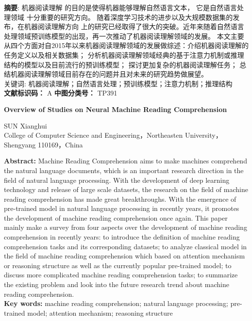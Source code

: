 \noindent \textbf{摘\quad 要}: 机器阅读理解
的目的是使得机器能够理解自然语言文本，
它是自然语言处理领域
十分重要的研究方向。
随着深度学习技术的进步以及大规模数据集的发布，在机器阅读理解方向
上的研究已经取得了很大的突破。近年来随着自然语言处理领域预训练模型的出现，再一次推动了机器阅读理解领域的发展。
本文主要从四个方面对自2015年以来机器阅读理解领域的发展做综述：介绍机器阅读理解的任务定义以及相关数据集；
分析机器阅读理解领域经典的基于注意力机制或推理结构的模型以及目前流行的预训练模型；
探讨更加复杂的机器阅读理解任务；
总结机器阅读理解领域目前存在的问题并且对未来的研究趋势做展望。\\
\heiti 关键词: \songti 机器阅读理解；自然语言处理；预训练模型；注意力机制；推理结构　\\
\textbf{文献标识码：} A  \qquad \textbf{中图分类号：} TP391
\begin{center}
    \textbf{ Overview of Studies on Neural Machine Reading Comprehension \\}

 SUN Xianghui \\
College of Computer Science and Engineering，Northeasten University，Shengyang 110169，China

\end{center}
\textbf{Abstract:} Machine Reading Comprehension aims to make machines comprehend the natural language documents, which 
is an important research direction
 in the field of natural language processing. With the development of deep learning technology and release of large scale datasets, the research on the field of machine reading comprehension has made great breakthroughs. 
 With the emergence of pre-trained model in natural language processing in recently years, it promotes the development of machine reading comprehension once again. This paper mainly make a survey from four aspects over the development of machine reading comprehension in recently years: to introduce the definition of 
  machine reading comprehension tasks and its corresponding datasets; to analyze classical model in the field of machine reading comprehension  
  which based on attention mechanism or reasoning structure as well as the currently 
  popular pre-trained model; to discuss more complicated machine reading comprehension tasks;
   to summarize the existing problem and look into the future research trend about machine reading comprehension. \\
\textbf{Key words:} machine reading comprehension; natural language processing; pre-trained model; attention mechanism; reasoning structure











